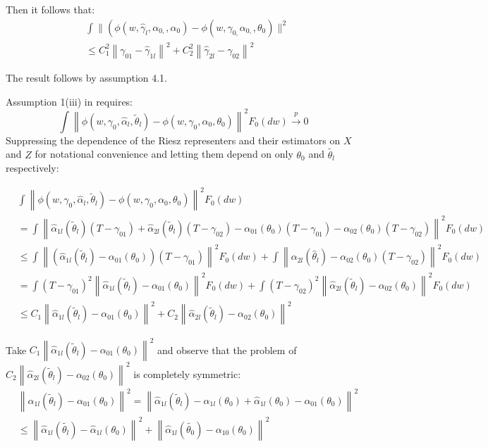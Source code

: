 Then it follows that:
\begin{align*}
&\int \| \left(\phi\left(w, \hat{\gamma}_l, \alpha_{0,}, \alpha_0\right)-\phi\left(w, \gamma_{0,} \alpha_{0,}, \theta_0\right) \|^2\right. \\
& \leq  C_1^2\left\|\gamma_{01}-\hat{\gamma}_{1 l}\right\|^2+C_2^2\left\|\hat{\gamma}_{2 l}-\gamma_{02}\right\|^2  
\end{align*}

The result follows by assumption 4.1.

Assumption 1(iii) in \citet{chernozhukov2022locally} requires:
\[
\int\left\|\phi\left(w, \gamma_0, \hat{\alpha}_{l}, \tilde{\theta}_{l}\right)-\phi\left(w, \gamma_0, \alpha_0, \theta_0\right)\right\|^2 F_0(dw) \xrightarrow{p} 0
\]
Suppressing the dependence of the Riesz representers and their estimators on $X$ and $Z$ for notational convenience and letting them depend on only $\theta_0$ and $\tilde{\theta_l}$ respectively:

\begin{align*}
&\int\left\| \phi(w, \gamma_0, \hat{\alpha}_{l}, \tilde{\theta}_{l})-\phi(w, \gamma_0, \alpha_0, \theta_0)\right\|^2 F_0(dw)\\
&= \int \left\| \hat{\alpha}_{1l}(\tilde{\theta}_l)(T-\gamma_{01})+\hat{\alpha}_{2l}(\tilde{\theta}_l)(T-\gamma_{02})-\alpha_{01}(\theta_0)(T-\gamma_{01})-\alpha_{02}(\theta_0)(T-\gamma_{02}) \right\|^2 F_0(dw) \\
& \leq \int\left\|(\hat{\alpha}_{1l}(\tilde{\theta}_l)-\alpha_{01}(\theta_0))(T-\gamma_{01})\right\|^2F_0(dw)+\int \left\| \alpha_{2l}(\hat{\theta}_l) -\alpha_{02}(\theta_0) (T-\gamma_{02}) \right\|^2 F_0(dw) \\
&= \int(T-\gamma_{01})^2\left\|\hat{\alpha}_{1l} (\tilde{\theta}_l)-\alpha_{01}(\theta_0 ) \right\|^2 F_0(dw) + \int(T-\gamma_{02})^2\left\|\hat{\alpha}_{2l} (\tilde{\theta}_l)-\alpha_{02}(\theta_0 ) \right\|^2 F_0(dw)\\
&\leq C_1 \left\|\hat{\alpha}_{1l} (\tilde{\theta}_l)-\alpha_{01}(\theta_0 ) \right\|^2 + C_2 \left\|\hat{\alpha}_{2l} (\tilde{\theta}_l)-\alpha_{02}(\theta_0 ) \right\|^2
\end{align*}

Take $C_1 \left\|\hat{\alpha}_{1l} (\tilde{\theta}_l)-\alpha_{01}(\theta_0 ) \right\|^2$ and observe that the problem of $C_2 \left\|\hat{\alpha}_{2l} (\tilde{\theta}_l)-\alpha_{02}(\theta_0 ) \right\|^2$ is completely symmetric:
\begin{align*}
&\left\|\hat{\alpha}_{1l} (\tilde{\theta}_l)-\alpha_{01}(\theta_0 ) \right\|^2=\left\|\hat{\alpha}_{1l} (\tilde{\theta}_l)-\hat{\alpha}_{1l}(\theta_0)+\hat{\alpha}_{1l}(\theta_0)-\alpha_{01}(\theta_0 ) \right\|^2 \\
& \leq \left\| \hat{\alpha}_{1l}(\tilde{\theta_l})-\hat{\alpha}_{1l}(\theta_0) \right \|^2 + \left\| \hat{\alpha}_{1l}(\tilde{\theta_0})-\alpha_{10}(\theta_0) \right \|^2
\end{align*}

